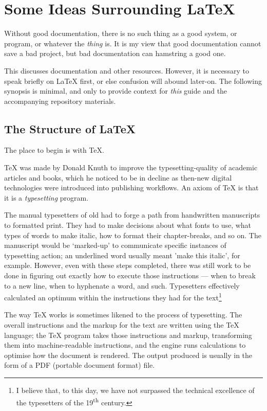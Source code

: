 \documentclass[11pt, oneside]{memoir}
\begin{document}
\chapter{Some Ideas Surrounding \LaTeX{}}
Without good documentation, there is no such thing as a good system, or program, or whatever the \emph{thing} is. It is my view that good documentation cannot save a bad project, but bad documentation can hamstring a good one.

This discusses documentation and other resources. However, it is necessary to speak briefly on LaTeX first, or else confusion will abound later-on. The following synopsis is minimal, and only to provide context for \emph{this} guide and the accompanying repository materials.

\section{The Structure of \LaTeX{}}

The place to begin is with \TeX{}.

TeX was made by Donald Knuth to improve the typesetting-quality of academic articles and books, which he noticed to be in decline as then-new digital technologies were introduced into publishing workflows. An axiom of \TeX{} is that it is a \emph{typesetting} program. 

The manual typesetters of old had to forge a path from handwritten manuscripts to formatted print. They had to make decisions about what fonts to use, what types of words to make italic, how to format their chapter-breaks, and so on. The manuscript would be `marked-up' to communicate specific instances of typesetting action; an underlined word usually meant 'make this italic', for example. However, even with these steps completed, there was still work to be done in figuring out exactly how to execute those instructions — when to break to a new line, when to hyphenate a word, and such. Typesetters effectively calculated an optimum within the instructions they had for the text\footnote{I believe that, to this day, we have not surpassed the technical excellence of the typesetters of the 19\textsuperscript{th} century.}

The way TeX works is sometimes likened to the process of typesetting. The overall instructions and the markup for the text are written using the TeX language; the TeX program takes those instructions and markup, transforming them into machine-readable instructions, and the engine runs calculations to optimise how the document is rendered. The output produced is usually in the form of a PDF (portable document format) file.
\end{document}
